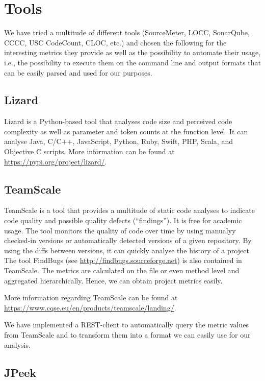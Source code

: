 \documentclass{scrartcl}
\begin{document}
\section{Tools}

We have tried a multitude of different tools (SourceMeter, LOCC, SonarQube,
CCCC, USC CodeCount, CLOC, etc.) and chosen the following for the interesting
metrics they provide as well as the possibility to automate their usage, i.e.,
the possibility to execute them on the command line and output formats that can
be easily parsed and used for our purposes.

\subsection{Lizard}
\label{sec:lizard}

Lizard is a Python-based tool that analyses code size and perceived code
complexity as well as parameter and token counts at the function level. It can
analyse Java, C/C++, JavaScript, Python, Ruby, Swift, PHP, Scala, and Objective
C scripts.  More information can be found at
\url{https://pypi.org/project/lizard/}.

\subsection{TeamScale}
\label{sec:teamscale}

TeamScale is a tool that provides a multitude of static code analyses to
indicate code quality and possible quality defects (\enquote{findings}). It is
free for academic usage. The tool monitors the quality of code over time by
using manualyy checked-in versions or automatically detected versions of a given
repository. By using the diffs between versions, it can quickly analyse the
history of a project. The tool FindBugs (see
\url{http://findbugs.sourceforge.net}) is also contained in TeamScale. The
metrics are calculated on the file or even method level and aggregated
hierarchically. Hence, we can obtain project metrics easily.

More information regarding TeamScale can be found at
\url{https://www.cqse.eu/en/products/teamscale/landing/}.

We have implemented a REST-client to automatically query the metric values from
TeamScale and to transform them into a format we can easily use for our
analysis.

\subsection{JPeek}
\label{sec:jpeek}
\end{document}

